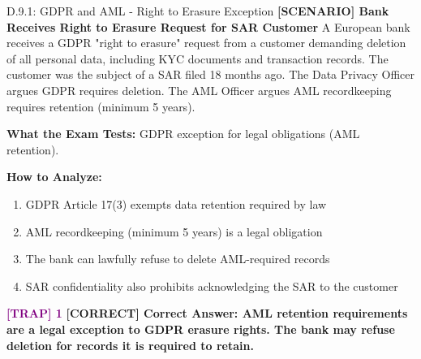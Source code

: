 \documentclass[11pt,a4paper]{beamer}
\newcommand{\trap}[1]{\textcolor{purple}{\textbf{[TRAP] 1}}}
\newcommand{\correct}[1]{\textcolor{green!50!black}{\textbf{[CORRECT] #1}}}
\newcommand{\scenario}[1]{\textcolor{blue!70!black}{\textbf{[SCENARIO] #1}}}
\begin{document}
\begin{frame}{D.9.1: GDPR and AML - Right to Erasure Exception}
	\scenario{Bank Receives Right to Erasure Request for SAR Customer}
	A European bank receives a GDPR "right to erasure" request from a customer demanding deletion of all personal data, including KYC documents and transaction records. The customer was the subject of a SAR filed 18 months ago. The Data Privacy Officer argues GDPR requires deletion. The AML Officer argues AML recordkeeping requires retention (minimum 5 years).
	
	\vspace{0.1cm}
	\textbf{What the Exam Tests:} GDPR exception for legal obligations (AML retention).
	
	\vspace{0.1cm}
	\textbf{How to Analyze:}
	\begin{enumerate}
		\item GDPR Article 17(3) exempts data retention required by law
		\item AML recordkeeping (minimum 5 years) is a legal obligation
		\item The bank can lawfully refuse to delete AML-required records
		\item SAR confidentiality also prohibits acknowledging the SAR to the customer
	\end{enumerate}
	
	\trap{Common Distractor: "GDPR's right to erasure is absolute and overrides all other laws."}
	\correct{Correct Answer: AML retention requirements are a legal exception to GDPR erasure rights. The bank may refuse deletion for records it is required to retain.}
\end{frame}

\end{document}

